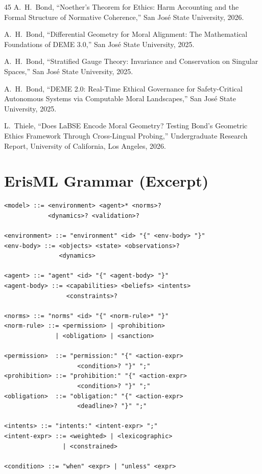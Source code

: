 \documentclass[conference]{IEEEtran}
\begin{document}
\begin{thebibliography}{45}
A.~H.~Bond, ``Noether's Theorem for Ethics: Harm Accounting and the Formal Structure of Normative Coherence,'' San Jos\'e State University, 2026.

A.~H.~Bond, ``Differential Geometry for Moral Alignment: The Mathematical Foundations of DEME 3.0,'' San Jos\'e State University, 2025.

A.~H.~Bond, ``Stratified Gauge Theory: Invariance and Conservation on Singular Spaces,'' San Jos\'e State University, 2025.

A.~H.~Bond, ``DEME 2.0: Real-Time Ethical Governance for Safety-Critical Autonomous Systems via Computable Moral Landscapes,'' San Jos\'e State University, 2025.

L.~Thiele, ``Does LaBSE Encode Moral Geometry? Testing Bond's Geometric Ethics Framework Through Cross-Lingual Probing,'' Undergraduate Research Report, University of California, Los Angeles, 2026.

\end{thebibliography}

\appendix

\section{ErisML Grammar (Excerpt)}
\label{app:grammar}

\begin{lstlisting}
<model> ::= <environment> <agent>* <norms>?
            <dynamics>? <validation>?

<environment> ::= "environment" <id> "{" <env-body> "}"
<env-body> ::= <objects> <state> <observations>?
               <dynamics>

<agent> ::= "agent" <id> "{" <agent-body> "}"
<agent-body> ::= <capabilities> <beliefs> <intents>
                 <constraints>?

<norms> ::= "norms" <id> "{" <norm-rule>* "}"
<norm-rule> ::= <permission> | <prohibition>
              | <obligation> | <sanction>

<permission>  ::= "permission:" "{" <action-expr>
                    <condition>? "}" ";"
<prohibition> ::= "prohibition:" "{" <action-expr>
                    <condition>? "}" ";"
<obligation>  ::= "obligation:" "{" <action-expr>
                    <deadline>? "}" ";"

<intents> ::= "intents:" <intent-expr> ";"
<intent-expr> ::= <weighted> | <lexicographic>
                | <constrained>

<condition> ::= "when" <expr> | "unless" <expr>
\end{lstlisting}
\end{document}
